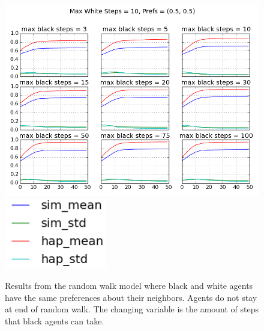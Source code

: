 \documentclass[11pt,twoside]{amsart}
\theoremstyle{theorem}
\theoremstyle{definition}
\theoremstyle{remark}
\begin{document}
    \begin{figure}[p]
        \center
        \includegraphics[scale=0.60]{rw_mixed_walk_same_prefs.png}
        \includegraphics[scale=0.40]{no_stay_at_end_legend.png}
        \caption{Results from the random walk model where black and white agents have the same preferences about their neighbors. Agents do not stay at end of random walk. The changing variable is the amount of steps that black agents can take.}
        \label{fig:rw_same_prefs}
    \end{figure}
\end{document}
